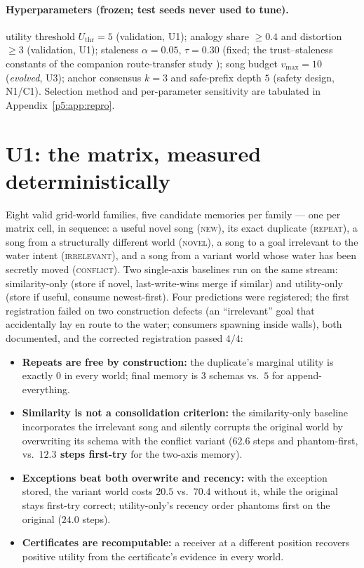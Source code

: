 \documentclass{article}
\begin{document}
\paragraph{Hyperparameters (frozen; test seeds never used to tune).}
utility threshold $U_{\mathrm{thr}}{=}5$ (validation, U1); analogy
share $\ge0.4$ and distortion $\ge3$ (validation, U1); staleness
$\alpha{=}0.05$, $\tau{=}0.30$ (fixed; the trust--staleness constants of the companion route-transfer study \citep{songlines2}); song budget
$v_{\max}{=}10$ (\emph{evolved}, U3); anchor consensus $k{=}3$ and
safe-prefix depth $5$ (safety design, N1/C1). Selection method and
per-parameter sensitivity are tabulated in
Appendix~\ref{p5:app:repro}.


\section{U1: the matrix, measured deterministically}
\label{p5:sec:u1}

Eight valid grid-world families, five candidate memories per family
--- one per matrix cell, in sequence: a useful novel song
(\textsc{new}), its exact duplicate (\textsc{repeat}), a song from a
structurally different world (\textsc{novel}), a song to a goal
irrelevant to the water intent (\textsc{irrelevant}), and a song from
a variant world whose water has been secretly moved
(\textsc{conflict}). Two single-axis baselines run on the same
stream: similarity-only (store if novel, last-write-wins merge if
similar) and utility-only (store if useful, consume newest-first).
Four predictions were registered; the first registration failed on
two construction defects (an ``irrelevant'' goal that accidentally
lay en route to the water; consumers spawning inside walls), both
documented, and the corrected registration passed $4/4$:

\begin{itemize}[leftmargin=16pt,itemsep=2pt,topsep=2pt]
\item \textbf{Repeats are free by construction:} the duplicate's
  marginal utility is exactly $0$ in every world; final memory is
  $3$ schemas vs.\ $5$ for append-everything.
\item \textbf{Similarity is not a consolidation criterion:} the
  similarity-only baseline incorporates the irrelevant song and
  silently corrupts the original world by overwriting its schema with
  the conflict variant ($62.6$ steps and phantom-first, vs.\
  \textbf{$12.3$ steps first-try} for the two-axis memory).
\item \textbf{Exceptions beat both overwrite and recency:} with the
  exception stored, the variant world costs $20.5$ vs.\ $70.4$
  without it, while the original stays first-try correct;
  utility-only's recency order phantoms first on the original
  ($24.0$ steps).
\item \textbf{Certificates are recomputable:} a receiver at a
  different position recovers positive utility from the certificate's
  evidence in every world.
\end{itemize}
\end{document}

